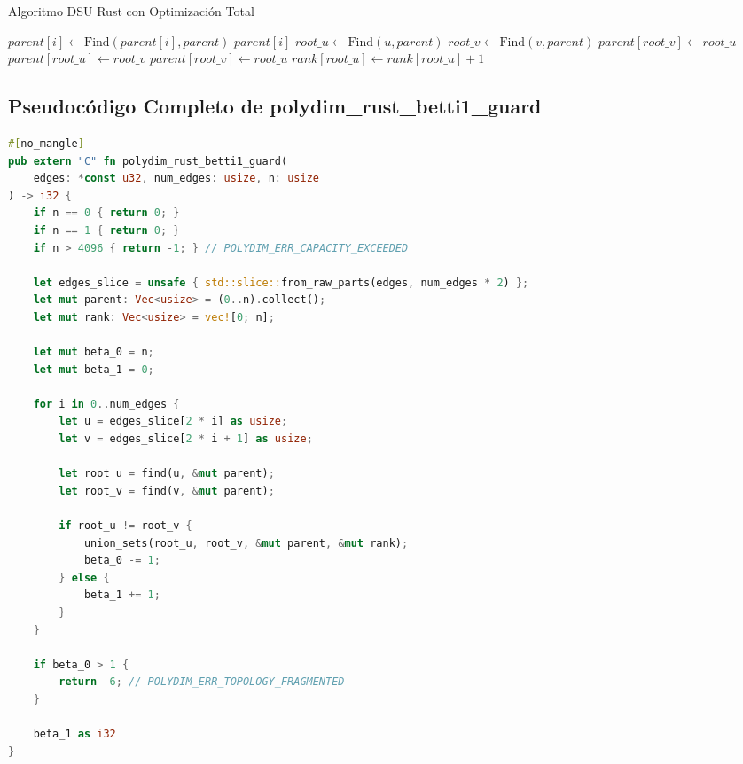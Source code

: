 \begin{algorithm}
\caption{Algoritmo DSU Rust con Optimización Total}
\begin{algorithmic}[1]
        \State $parent[i] \gets \text{Find}(parent[i], parent)$ 
    \EndIf
    \State \Return $parent[i]$
\EndProcedure
{}
    \State $root\_u \gets \text{Find}(u, parent)$
    \State $root\_v \gets \text{Find}(v, parent)$
            \State $parent[root\_v] \gets root\_u$
            \State $parent[root\_u] \gets root\_v$
        \Else
            \State $parent[root\_v] \gets root\_u$
            \State $rank[root\_u] \gets rank[root\_u] + 1$
        \EndIf
    \EndIf
\EndProcedure
\end{algorithmic}
\end{algorithm}

\subsection{Pseudocódigo Completo de polydim\_rust\_betti1\_guard}
\begin{lstlisting}[language=Rust]
#[no_mangle]
pub extern "C" fn polydim_rust_betti1_guard(
    edges: *const u32, num_edges: usize, n: usize
) -> i32 {
    if n == 0 { return 0; }
    if n == 1 { return 0; }
    if n > 4096 { return -1; } // POLYDIM_ERR_CAPACITY_EXCEEDED

    let edges_slice = unsafe { std::slice::from_raw_parts(edges, num_edges * 2) };
    let mut parent: Vec<usize> = (0..n).collect();
    let mut rank: Vec<usize> = vec![0; n];
    
    let mut beta_0 = n;
    let mut beta_1 = 0;
    
    for i in 0..num_edges {
        let u = edges_slice[2 * i] as usize;
        let v = edges_slice[2 * i + 1] as usize;
        
        let root_u = find(u, &mut parent);
        let root_v = find(v, &mut parent);
        
        if root_u != root_v {
            union_sets(root_u, root_v, &mut parent, &mut rank);
            beta_0 -= 1;
        } else {
            beta_1 += 1;
        }
    }
    
    if beta_0 > 1 {
        return -6; // POLYDIM_ERR_TOPOLOGY_FRAGMENTED
    }
    
    beta_1 as i32
}
\end{lstlisting}

